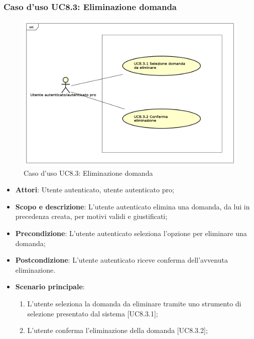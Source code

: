 	\subsubsection{Caso d'uso UC8.3: Eliminazione domanda}	
	\label{UC8.3}
	\begin{figure}[h]
		\centering
			\includegraphics[scale=0.45,keepaspectratio]{UML/UC8_3.png}
		\caption{Caso d'uso UC8.3: Eliminazione domanda}
	\end{figure}
	\FloatBarrier
	\begin{itemize}
		\item
			\textbf{Attori}: Utente autenticato, utente autenticato pro;
		\item		
			\textbf{Scopo e descrizione}: L'utente autenticato elimina una domanda, da lui in precedenza creata, per motivi validi e giustificati;
		\item
			\textbf{Precondizione}: L'utente autenticato seleziona l'opzione per eliminare una domanda;
		\item
			\textbf{	Postcondizione}: L'utente autenticato riceve conferma dell'avvenuta eliminazione.
		\item
			\textbf{Scenario principale}:
	       		\begin{enumerate}
					\item
					L'utente seleziona la domanda da eliminare tramite uno strumento di selezione presentato dal sistema [UC8.3.1];
					\item
					L'utente conferma l'eliminazione della domanda [UC8.3.2];
	 			\end{enumerate}
	\end{itemize}
